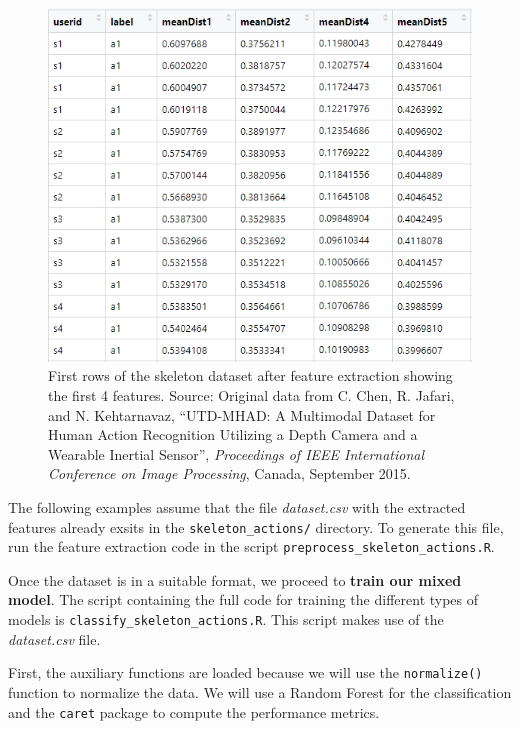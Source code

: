 \documentclass[
  11pt,
]{krantz}
\makeatletter
\newenvironment{kframe}{%
\medskip{}
\setlength{\fboxsep}{.8em}
 \def\at@end@of@kframe{}%
 \ifinner\ifhmode%
  \def\at@end@of@kframe{\end{minipage}}%
  \begin{minipage}{\columnwidth}%
 \fi\fi%
 \def\FrameCommand##1{\hskip\@totalleftmargin \hskip-\fboxsep
 \colorbox{shadecolor}{##1}\hskip-\fboxsep
     \hskip-\linewidth \hskip-\@totalleftmargin \hskip\columnwidth}%
 \MakeFramed {\advance\hsize-\width
   \@totalleftmargin\z@ \linewidth\hsize
   \@setminipage}}%
 {\par\unskip\endMakeFramed%
 \at@end@of@kframe}
\newenvironment{rmdblock}[1]
  {
  \begin{itemize}
  \renewcommand{\labelitemi}{
    \raisebox{-.7\height}[0pt][0pt]{
      {\setkeys{Gin}{width=3em,keepaspectratio}\texttt{[image: images/icons/\#1]}}
    }
  }
  \setlength{\fboxsep}{1em}
  \begin{kframe}
  \item
  }
  {
  \end{kframe}
  \end{itemize}
  }
\newenvironment{rmdgoodpractice}
  {\begin{rmdblock}{goodpractice}}
  {\end{rmdblock}}
\makeatother
\begin{document}
\begin{figure}

{\centering \includegraphics[width=0.7\linewidth]{images/skl_features} 

}

\caption{First rows of the skeleton dataset after feature extraction showing the first 4 features. Source: Original data from C. Chen, R. Jafari, and N. Kehtarnavaz, ``UTD-MHAD: A Multimodal Dataset for Human Action Recognition Utilizing a Depth Camera and a Wearable Inertial Sensor'', \emph{Proceedings of IEEE International Conference on Image Processing}, Canada, September 2015.}\label{fig:sklFeatures}
\end{figure}

\begin{rmdgoodpractice}
The following examples assume that the file \emph{dataset.csv} with the extracted features already exsits in the \texttt{skeleton\_actions/} directory. To generate this file, run the feature extraction code in the script \texttt{preprocess\_skeleton\_actions.R}.
\end{rmdgoodpractice}

Once the dataset is in a suitable format, we proceed to \textbf{train our mixed model}. The script containing the full code for training the different types of models is \texttt{classify\_skeleton\_actions.R}. This script makes use of the \emph{dataset.csv} file.

First, the auxiliary functions are loaded because we will use the \texttt{normalize()} function to normalize the data. We will use a Random Forest for the classification and the \texttt{caret} package to compute the performance metrics.
\end{document}
